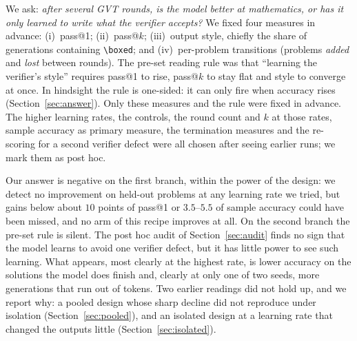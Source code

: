 \documentclass[runningheads]{llncs}
\begin{document}
We ask: \emph{after several GVT rounds, is the model better at mathematics, or
has it only learned to write what the verifier accepts?} We fixed four measures
in advance: (i)~pass@1; (ii)~pass@$k$; (iii)~output style, chiefly the share of
generations containing \verb|\boxed|; and (iv)~per-problem transitions
(problems \emph{added} and \emph{lost} between rounds). The pre-set reading rule
was that ``learning the verifier's style'' requires pass@1 to rise, pass@$k$ to
stay flat and style to converge at once. In hindsight the rule is one-sided: it
can only fire when accuracy rises (Section~\ref{sec:answer}). Only these
measures and the rule were fixed in advance. The higher learning rates, the
controls, the round count and $k$ at those rates, sample accuracy as primary
measure, the termination measures and the re-scoring for a second verifier
defect were all chosen after seeing earlier runs; we mark them as post hoc.

Our answer is negative on the first branch, within the power of the design:
we detect no improvement on held-out problems at any learning rate we tried,
but gains below about $10$ points of pass@1 or $3.5$--$5.5$ of sample accuracy
could have been missed, and no arm of this recipe improves at all. On the
second branch the pre-set rule is silent. The post hoc audit of
Section~\ref{sec:audit} finds no sign that the model learns to avoid one
verifier defect, but it has little power to see such learning. What appears,
most clearly at the highest rate, is lower accuracy on the solutions the model
does finish and, clearly at only one of two seeds, more generations that run
out of tokens. Two earlier readings
did not hold up, and we report why: a pooled design whose sharp decline did not
reproduce under isolation (Section~\ref{sec:pooled}), and an isolated design at
a learning rate that changed the outputs little (Section~\ref{sec:isolated}).
\end{document}
